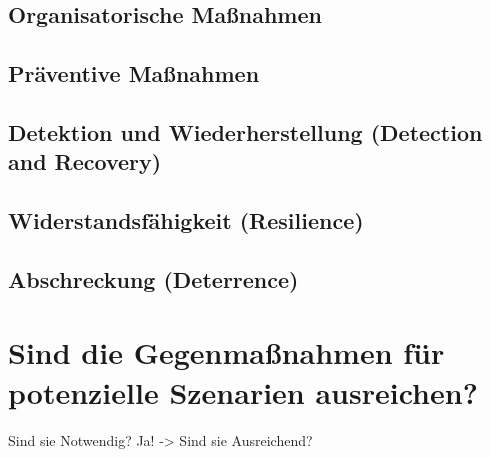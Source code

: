 \documentclass[final,bibliography=totocnumbered]{include/sikseminar}
\begin{document}
\subsection{Organisatorische Maßnahmen}\label{subsec:orga}

\subsection{Präventive Maßnahmen}\label{subsec:präventiv}

\subsection{Detektion und Wiederherstellung (Detection and Recovery)}\label{subsec:detektion}

\subsection{Widerstandsfähigkeit (Resilience)}\label{subsec:widerstand} %


\subsection{Abschreckung (Deterrence)}\label{subsec:abschreckung} %

\section{Sind die Gegenmaßnahmen für potenzielle Szenarien ausreichen?}\label{sec:diskussion}

Sind sie Notwendig?
Ja! -> Sind sie Ausreichend?

\newpage
\printglossary[type=\acronymtype]
~\nocite{*}

\printbibliography
\newpage
\end{document}
